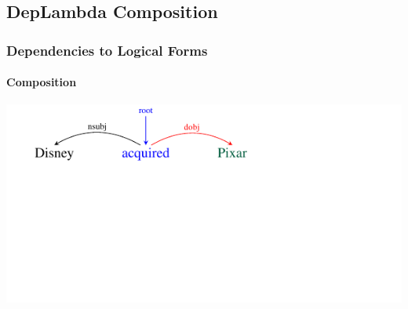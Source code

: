 \documentclass[mathserif,12pt]{beamer}
\begin{document}
\subsection{DepLambda Composition}
\begin{frame}
\frametitle{Dependencies to Logical Forms}
\framesubtitle{Composition}
\begin{center}
\includegraphics[trim=2em 9.4em 10em 0em,clip=true,scale=1.3]{figures/pixar_dobj} 

\vspace{0.8cm}


\end{center}
\end{frame}
\end{document}
